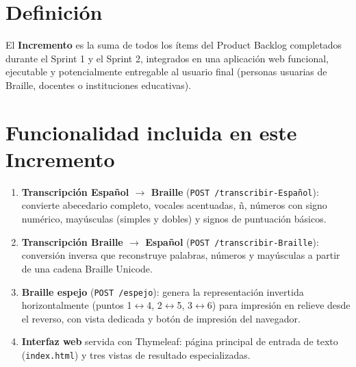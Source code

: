 \documentclass[11pt]{article}
\begin{document}

\section{Definición}
El \textbf{Incremento} es la suma de todos los ítems del Product Backlog completados durante el
Sprint 1 y el Sprint 2, integrados en una aplicación web funcional, ejecutable y potencialmente
entregable al usuario final (personas usuarias de Braille, docentes o instituciones educativas).

\section{Funcionalidad incluida en este Incremento}
\begin{enumerate}[leftmargin=1.4cm]
  \item \textbf{Transcripción Español \(\rightarrow\) Braille} (\texttt{POST /transcribir-Español}):
        convierte abecedario completo, vocales acentuadas, ñ, números con signo numérico, mayúsculas
        (simples y dobles) y signos de puntuación básicos.
  \item \textbf{Transcripción Braille \(\rightarrow\) Español} (\texttt{POST /transcribir-Braille}):
        conversión inversa que reconstruye palabras, números y mayúsculas a partir de una cadena Braille
        Unicode.
  \item \textbf{Braille espejo} (\texttt{POST /espejo}): genera la representación invertida horizontalmente
        (puntos 1\(\leftrightarrow\)4, 2\(\leftrightarrow\)5, 3\(\leftrightarrow\)6) para impresión en
        relieve desde el reverso, con vista dedicada y botón de impresión del navegador.
  \item \textbf{Interfaz web} servida con Thymeleaf: página principal de entrada de texto
        (\texttt{index.html}) y tres vistas de resultado especializadas.
\end{enumerate}
\end{document}
